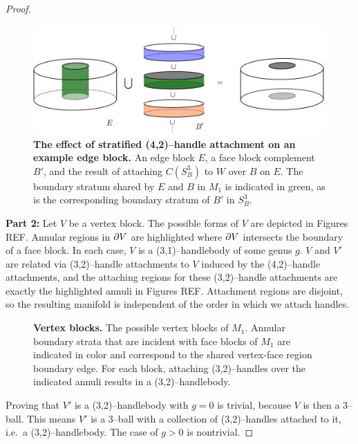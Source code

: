 \begin{proof}
	\begin{figure}[h!]
		\centering
		\includegraphics[width=\textwidth]{figures/edge-face-shared-boundary.png}
		\caption{
			\textbf{The effect of stratified (4,2)--handle attachment on an example edge block.}
			An edge block $E$, a face block complement $B'$, and the result of attaching $C(S_B^3)$ to $W$ over $B$ on $E$.
			The boundary stratum shared by $E$ and $B$ in $M_1$ is indicated in green, as is the corresponding boundary stratum of $B'$ in $S_B^3$.
		}
		\label{fig:edge-face-shared-boundary}
	\end{figure}
	
	\textbf{Part 2:}
	Let $V$ be a vertex block.
	The possible forms of $V$ are depicted in Figures REF.
	Annular regions in $\partial V$ are highlighted where $\partial V$ intersects the boundary of a face block. 
	In each case, $V$ is a (3,1)--handlebody of some genus $g$.
	$V$ and $V'$ are related via (3,2)--handle attachments to $V$ induced by the (4,2)--handle attachments, and the attaching regions for these (3,2)--handle attachments are exactly the highlighted annuli in Figures REF.
	Attachment regions are disjoint, so the resulting manifold is independent of the order in which we attach handles.
	
	\begin{figure}[h!]
		\centering
		\caption{
			\textbf{Vertex blocks.}
			The possible vertex blocks of $M_1$.
			Annular boundary strata that are incident with face blocks of $M_1$ are indicated in color and correspond to the shared vertex-face region boundary edge.
			For each block, attaching (3,2)--handles over the indicated annuli results in a (3,2)--handlebody.
		}
		\label{fig:vertex-block-incidence}
	\end{figure}
	
	Proving that $V'$ is a (3,2)--handlebody with $g=0$ is trivial, because $V$ is then a 3--ball.
	This means $V'$ is a 3--ball with a collection of (3,2)--handles attached to it, i.e.\ a (3,2)--handlebody.
	The case of $g>0$ is nontrivial.
	

\end{proof}
